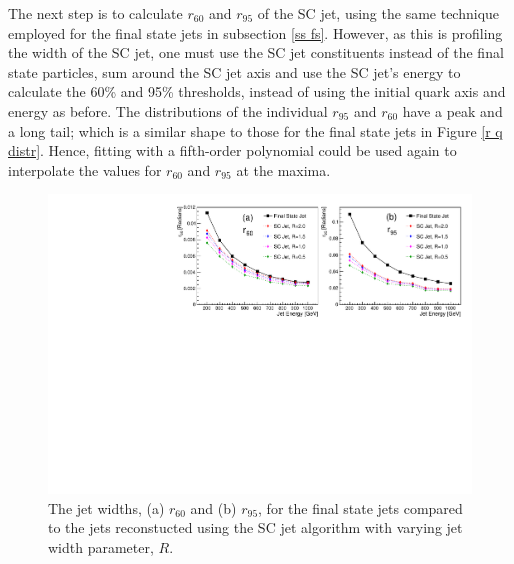 \documentclass[a4paper,11pt, onecolumn]{article}
\begin{document}
  The next step is to calculate $r_{60}$ and $r_{95}$ of the SC jet, using the same technique employed for the final state jets in subsection 
  \ref{ss fs}. However, as this is profiling the width of the SC jet, one must use the SC jet constituents instead of the 
  final state particles, sum around the SC jet axis and use the SC jet's energy to calculate the 
  60\% and 95\% thresholds, instead of using the initial quark axis and energy as before.
  The distributions of the individual $r_{95}$ and $r_{60}$ have a peak and a long tail; which is a similar shape to those 
  for the final state jets in Figure \ref{r q distr}.
  Hence, fitting with a fifth-order polynomial could be used again to interpolate the values for $r_{60}$ and $r_{95}$ at the maxima. \\

  \begin{figure}[!htb]
    \begin{center}
      \includegraphics[width = \textwidth]{r_sc}
      \caption{The jet widths, (a) $r_{60}$ and (b) $r_{95}$, for the final state jets compared to the jets reconstucted using the SC jet algorithm with
              varying jet width parameter, $R$. }
      \label{r sc}
    \end{center}
  \end{figure}
  \vspace{-0.5cm}
\end{document}
